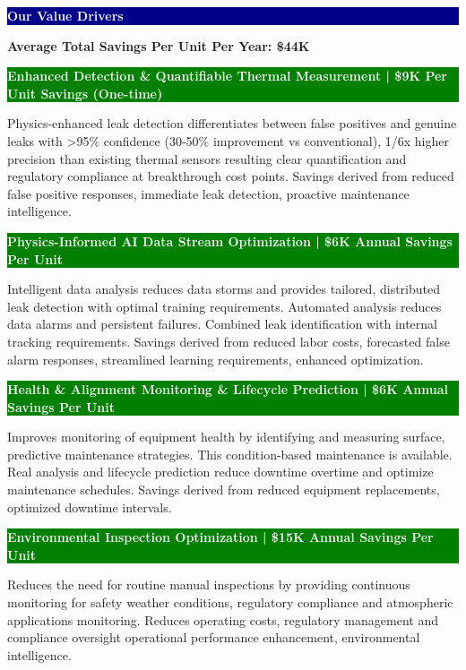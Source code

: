 \documentclass[11pt,a4paper]{article}
\begin{document}
\hfill
\begin{minipage}{0.48\textwidth}

\colorbox{darkblue}{\parbox{\linewidth}{\centering\textcolor{white}{\textbf{Our Value Drivers}}}}

\vspace{0.2cm}
\textbf{Average Total Savings Per Unit Per Year: \$44K}

\vspace{0.3cm}

\colorbox{green}{\parbox{\linewidth}{\textcolor{white}{\textbf{Enhanced Detection \& Quantifiable Thermal Measurement | \$9K Per Unit Savings (One-time)}}}}
\small Physics-enhanced leak detection differentiates between false positives and genuine leaks with >95\% confidence (30-50\% improvement vs conventional), 1/6x higher precision than existing thermal sensors resulting clear quantification and regulatory compliance at breakthrough cost points. Savings derived from reduced false positive responses, immediate leak detection, proactive maintenance intelligence.

\vspace{0.2cm}

\colorbox{green}{\parbox{\linewidth}{\textcolor{white}{\textbf{Physics-Informed AI Data Stream Optimization | \$6K Annual Savings Per Unit}}}}
\small Intelligent data analysis reduces data storms and provides tailored, distributed leak detection with optimal training requirements. Automated analysis reduces data alarms and persistent failures. Combined leak identification with internal tracking requirements. Savings derived from reduced labor costs, forecasted false alarm responses, streamlined learning requirements, enhanced optimization.

\vspace{0.2cm}

\colorbox{green}{\parbox{\linewidth}{\textcolor{white}{\textbf{Health \& Alignment Monitoring \& Lifecycle Prediction | \$6K Annual Savings Per Unit}}}}
\small Improves monitoring of equipment health by identifying and measuring surface, predictive maintenance strategies. This condition-based maintenance is available. Real analysis and lifecycle prediction reduce downtime overtime and optimize maintenance schedules. Savings derived from reduced equipment replacements, optimized downtime intervals.

\vspace{0.2cm}

\colorbox{green}{\parbox{\linewidth}{\textcolor{white}{\textbf{Environmental Inspection Optimization | \$15K Annual Savings Per Unit}}}}
\small Reduces the need for routine manual inspections by providing continuous monitoring for safety weather conditions, regulatory compliance and atmospheric applications monitoring. Reduces operating costs, regulatory management and compliance oversight operational performance enhancement, environmental intelligence.


\end{minipage}
\end{document}
